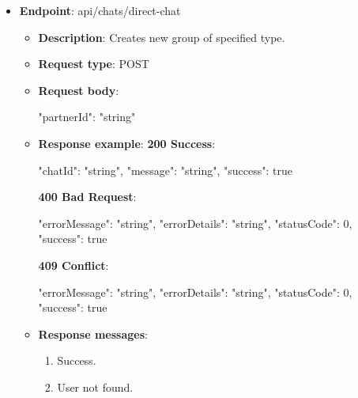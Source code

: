 \begin{itemize}
    \item \textbf{Endpoint}: api/chats/direct-chat
    \begin{itemize}
        \item \textbf{Description}: Creates new group of specified type.
        \item \textbf{Request type}: POST
        \item \textbf{Request body}:
        \begin{spverbatim}
        {
            "partnerId": "string"
        }
        \end{spverbatim}
        \item \textbf{Response example}:
        \textbf{200 Success}:
        \begin{spverbatim}
        {
            "chatId": "string",
            "message": "string",
            "success": true
        }
        \end{spverbatim}
        \textbf{400 Bad Request}:
        \begin{spverbatim}
        {
            "errorMessage": "string",
            "errorDetails": "string",
            "statusCode": 0,
            "success": true
        }
        \end{spverbatim}
        \textbf{409 Conflict}:
        \begin{spverbatim}
        {
            "errorMessage": "string",
            "errorDetails": "string",
            "statusCode": 0,
            "success": true
        }
        \end{spverbatim}
        \item \textbf{Response messages}:
        \begin{enumerate}
            \item Success.
            \item User not found.
        \end{enumerate}
    \end{itemize}


\end{itemize}
